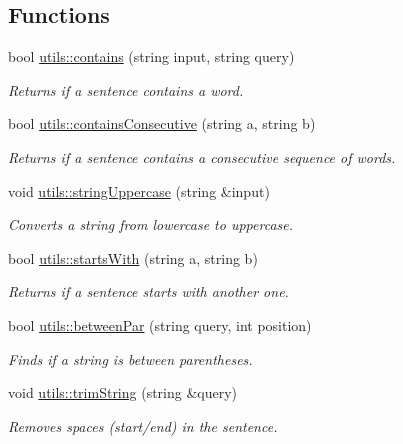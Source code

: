 \subsection*{Functions}
\begin{DoxyCompactItemize}
\item 
bool \hyperlink{namespaceutils_a69c832543a093a8099189e4755695a62}{utils\+::contains} (string input, string query)
\begin{DoxyCompactList}\small\item\em Returns if a sentence contains a word. \end{DoxyCompactList}\item 
bool \hyperlink{namespaceutils_af9af9e01b679f955003203f29ddf130b}{utils\+::contains\+Consecutive} (string a, string b)
\begin{DoxyCompactList}\small\item\em Returns if a sentence contains a consecutive sequence of words. \end{DoxyCompactList}\item 
void \hyperlink{namespaceutils_a4cc31521e740c9e31b4bfa8ee85eff46}{utils\+::string\+Uppercase} (string \&input)
\begin{DoxyCompactList}\small\item\em Converts a string from lowercase to uppercase. \end{DoxyCompactList}\item 
bool \hyperlink{namespaceutils_ae840ea1b4ad4ce23c2b48158ac75d557}{utils\+::starts\+With} (string a, string b)
\begin{DoxyCompactList}\small\item\em Returns if a sentence starts with another one. \end{DoxyCompactList}\item 
bool \hyperlink{namespaceutils_a1e1de2e5772bffdfe2c8d3309a61ddab}{utils\+::between\+Par} (string query, int position)
\begin{DoxyCompactList}\small\item\em Finds if a string is between parentheses. \end{DoxyCompactList}\item 
void \hyperlink{namespaceutils_a9f184d101ac739ab058355ab5413ca9a}{utils\+::trim\+String} (string \&query)
\begin{DoxyCompactList}\small\item\em Removes spaces (start/end) in the sentence. \end{DoxyCompactList}\item 

\end{DoxyCompactItemize}
